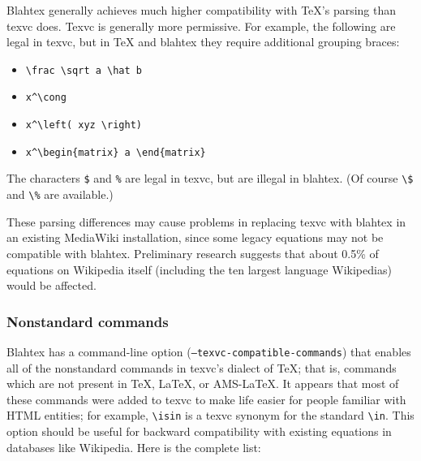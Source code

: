 \documentclass{article}
\newcommand{\texcommand}[1]{\textbackslash{}#1}
\begin{document}
Blahtex generally achieves much higher compatibility with \TeX{}'s parsing than texvc does. Texvc is generally more permissive. For example, the following are legal in texvc, but in \TeX{} and blahtex they require additional grouping braces:
\begin{itemize}
\item \texttt{\texcommand{frac} \texcommand{sqrt} a \texcommand{hat} b}
\item \texttt{x\textasciicircum\texcommand{cong}}
\item \texttt{x\textasciicircum\texcommand{left}( xyz \texcommand{right})}
\item \texttt{x\textasciicircum\texcommand{begin}\{matrix\} a \texcommand{end}\{matrix\}}
\end{itemize}

The characters \texttt{\$} and \texttt{\%} are legal in texvc, but are illegal in blahtex. (Of course \texttt{\texcommand{\$}} and \texttt{\texcommand{\%}} are available.)

These parsing differences may cause problems in replacing texvc with blahtex in an existing MediaWiki installation, since some legacy equations may not be compatible with blahtex. Preliminary research suggests that about 0.5\% of equations on Wikipedia itself (including the ten largest language Wikipedias) would be affected.

\subsubsection{Nonstandard commands}\label{sec:texvc-compatible-commands}

Blahtex has a command-line option (\texttt{--texvc-compatible-commands}) that enables all of the nonstandard commands in texvc's dialect of \TeX{}; that is, commands which are not present in \TeX{}, \LaTeX{}, or AMS-\LaTeX{}. It appears that most of these commands were added to texvc to make life easier for people familiar with HTML entities; for example, \texttt{\texcommand{isin}} is a texvc synonym for the standard \texttt{\texcommand{in}}. This option should be useful for backward compatibility with existing equations in databases like Wikipedia. Here is the complete list:
\end{document}
